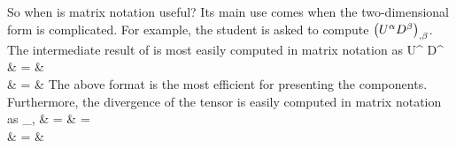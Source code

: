 \documentclass[12pt]{article}
\begin{document}
So when is matrix notation useful?  Its main use comes when the two-dimensional form is
complicated.  For example, the student is asked to compute
$\left( { {U}{{}^{\alpha} }   {D}{{}^{\beta} } } \right)_{,\beta}$.  The intermediate result
of  is most easily computed in matrix notation as
\bea
  U^{\ga} D^{\gb} & = & 
                         \nonumber \\
                  & = &  \eqp
\eea
The above format is the most efficient for presenting the components.  Furthermore, the
divergence of the tensor is easily computed in matrix notation as
\bea
  _{,\gb} & = & 
                                   = 
                                      \nonumber \\
       & = &
 \nonumber \\
\end{document}
